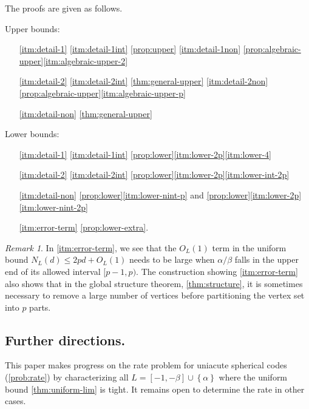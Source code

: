\documentclass[reqno, 11pt]{amsart}
\theoremstyle{definition}
\theoremstyle{remark}
\newtheorem{remark}[theorem]{Remark}
\newcommand{\set}[1]{\left\{ #1 \right\}}
\begin{document}
The proofs are given as follows.

Upper bounds:
\begin{enumerate}
\item[\ref{itm:detail-1}]
\ref{itm:detail-1int} \cref{prop:upper} \quad 
\ref{itm:detail-1non} \cref{prop:algebraic-upper}\ref{itm:algebraic-upper-2}
\item [\ref{itm:detail-2}]
\ref{itm:detail-2int} \cref{thm:general-upper} \quad 
\ref{itm:detail-2non} \cref{prop:algebraic-upper}\ref{itm:algebraic-upper-p}
\item [\ref{itm:detail-non}]  \cref{thm:general-upper}
\end{enumerate}

Lower bounds:
\begin{enumerate}
\item[\ref{itm:detail-1}]
\ref{itm:detail-1int} \cref{prop:lower}\ref{itm:lower-2p}\ref{itm:lower-4}

\item [\ref{itm:detail-2}]
\ref{itm:detail-2int} \cref{prop:lower}\ref{itm:lower-2p}\ref{itm:lower-int-2p}

\item [\ref{itm:detail-non}]  \cref{prop:lower}\ref{itm:lower-nint-p} and \cref{prop:lower}\ref{itm:lower-2p}\ref{itm:lower-nint-2p}
\item [\ref{itm:error-term}] \cref{prop:lower-extra}.
\end{enumerate}






\begin{remark}
In \ref{itm:error-term}, we see that the $O_L(1)$ term in the uniform bound $N_L(d) \le 2pd + O_L(1)$ needs to be large when $\alpha/\beta$ falls in the upper end of its allowed interval $[p-1,p)$. 
The construction showing \ref{itm:error-term} also shows that in the global structure theorem, \cref{thm:structure}, it is sometimes necessary to remove a large number of vertices before partitioning the vertex set into $p$ parts.
\end{remark}

\subsection{Further directions.}
This paper makes progress on the rate problem for uniacute spherical codes (\cref{prob:rate}) by characterizing all $L = [-1,-\beta]\cup\set{\alpha}$ where the uniform bound \cref{thm:uniform-lim} is tight. 
It remains open to determine the rate in other cases. 
\end{document}
